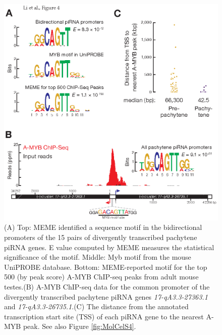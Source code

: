     \begin{figure}[htbp] %
      \centering 
      \includegraphics{Figures/MolCel/MolCel2013_Fig4.eps}
      \caption[A-MYB Binds the Promoters of Pachytene piRNA Genes]
      {
       (A) Top: MEME identified a sequence motif in the bidirectional promoters of the 15 pairs of divergently transcribed pachytene piRNA genes. E value computed by MEME measures the statistical significance of the motif. Middle: Myb motif from the mouse UniPROBE database. Bottom: MEME-reported motif for the top 500 (by peak score) A-MYB ChIP-seq peaks from adult mouse testes.(B) A-MYB ChIP-seq data for the common promoter of the divergently transcribed pachytene piRNA genes \textit{17-qA3.3-27363.1} and \textit{17-qA3.3-26735.1}.(C) The distance from the annotated transcription start site (TSS) of each piRNA gene to the nearest A-MYB peak. See also Figure \ref{fig:MolCelS4}.
      	}
      \label{fig:MolCelF4}
    	\end{figure}
